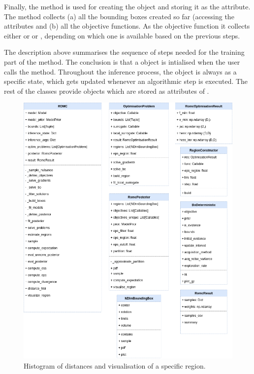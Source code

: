 Finally, the  method is used for creating
the  object and storing it as the
 attribute. The method collects (a) all the
bounding boxes created so far (accessing the
 attributes and (b) all the objective functions. As the objective function it collects either  or  or , depending on which one is available based on the previous steps.

The description above summarises the sequence of steps needed for the
training part of the method. The conclusion is that a 
object is intialised when the user calls the method. Throughout the
inference process, the  object is always as a specific state,
which gets updated whenever an algorithmic step is executed. The rest
of the classes provide objects which are stored as attributes of
.

\begin{figure}[h]
    \begin{center}
      \includegraphics[width=\textwidth]{./Thesis/graphs/RomcEntityDiagram.png}
    \end{center}
  \caption{Histogram of distances and visualisation of a specific region.}
  \label{fig:example_training}
\end{figure}



